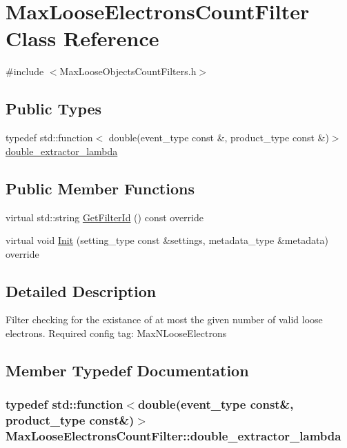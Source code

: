 \hypertarget{classMaxLooseElectronsCountFilter}{
\section{MaxLooseElectronsCountFilter Class Reference}
\label{classMaxLooseElectronsCountFilter}
}


{\ttfamily \#include $<$MaxLooseObjectsCountFilters.h$>$}\subsection*{Public Types}
\begin{DoxyCompactItemize}
\item 
typedef std::function$<$ double(event\_\-type const \&, product\_\-type const \&)$>$ \hyperlink{classMaxLooseElectronsCountFilter_a6da7a592ef0e21bdf5e2241f4dd4506a}{double\_\-extractor\_\-lambda}
\end{DoxyCompactItemize}
\subsection*{Public Member Functions}
\begin{DoxyCompactItemize}
\item 
virtual std::string \hyperlink{classMaxLooseElectronsCountFilter_a1c3982b0f7faf50d8158da566825251f}{GetFilterId} () const override
\item 
virtual void \hyperlink{classMaxLooseElectronsCountFilter_ae0fd3396d0f69343224627fa33ce8595}{Init} (setting\_\-type const \&settings, metadata\_\-type \&metadata) override
\end{DoxyCompactItemize}


\subsection{Detailed Description}
Filter checking for the existance of at most the given number of valid loose electrons. Required config tag: MaxNLooseElectrons 

\subsection{Member Typedef Documentation}
\hypertarget{classMaxLooseElectronsCountFilter_a6da7a592ef0e21bdf5e2241f4dd4506a}{
\subsubsection[{double\_\-extractor\_\-lambda}]{\setlength{\rightskip}{0pt plus 5cm}typedef std::function$<$double(event\_\-type const\&, product\_\-type const\&)$>$ {\bf MaxLooseElectronsCountFilter::double\_\-extractor\_\-lambda}}}
\label{classMaxLooseElectronsCountFilter_a6da7a592ef0e21bdf5e2241f4dd4506a}



